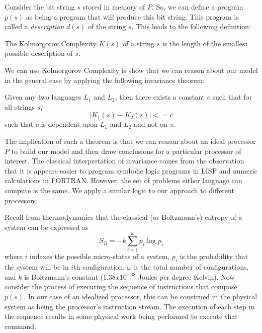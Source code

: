\documentclass[times, 10pt,onecolumn]{article}
\begin{document}
Consider the bit string $s$ stored in memory of $P$.  So,
we can define a program $p(s)$ as being a program that will produce this
bit string.   This program is called a \textit{description} $d(s)$ of the
string $s$.   This leads to the following definition:
\begin{defn}
  The Kolmorgorov Complexity $K(s)$ of a string $s$ is the length of the
  smallest possible description of $s$.
\end{defn}
We can use Kolmorgorov Complexity is show that we can reason about our
model in the general case by applying the following invariance theorem:
\begin{thm}
  Given any two languages $L_{1}$ and $L_{2}$, then there exists a
  constant $c$ such that for all strings $s$, 
  \begin{equation}
    |K_{1}(s) - K_{2}(s)| <= c
  \end{equation}
  such that $c$ is dependent upon $L_{1}$ and $L_{2}$ and not on $s$.
\end{thm}
The implication of such a theorem is that we can reason about an ideal
processor $P$ to build our model and then draw conclusions for a
particular processor of interest.   The classical interpretation of
invariance comes from the observation that it is appears easier to
program symbolic logic programs in LISP and numeric calculations in
FORTRAN.  However, the set of problems either language can compute is
the same.   We apply a similar logic to our approach to different processors.

Recall from thermodynamics that the classical (or Boltzmann's) entropy of a
system can be expressed as
\begin{equation}
  \label{eq:boltzmann}
  S_{B}=-k\sum_{i=1}^{\omega}p_{i}\log{p_{i}}
\end{equation}
where $i$ indexes the possible micro-states of a system, $p_{i}$ is the
probability that the system will be in $i$th configuration, $\omega$ is the
total number of configurations, and $k$ is Boltzmann's constant
($1.38x10^{-38}$ Joules per degree Kelvin).  Now consider the process of
executing the sequence of instructions that compose $p(s)$.  In our case of an
idealized processor, this can be construed in the physical system as being
the processor's instruction stream.  The execution of each step in the
sequence results in some physical work being performed to execute that
command.  
\end{document}
